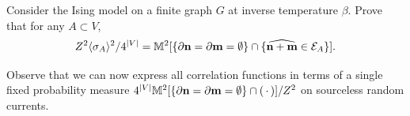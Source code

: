 \begin{exercise}
    Consider the Ising model on a finite graph $G$
    at inverse temperature $\beta$.
    Prove that for any $A\subset V$,
    \[
        Z^2\langle\sigma_A\rangle^2/4^{|V|}
        =
        \mathbb M^2[\{\partial\mathbf{n}=\partial\mathbf{m}=\emptyset\}\cap\{\widehat{\mathbf{n}+\mathbf{m}}\in\mathcal E_A\}].
    \]

    Observe that we can now express all correlation functions in terms of a single
    fixed probability measure
    $4^{|V|}\mathbb M^2[\{\partial\mathbf{n}=\partial\mathbf{m}=\emptyset\}\cap(\,\cdot\,)]/Z^2$ on sourceless
    random currents.
\end{exercise}
